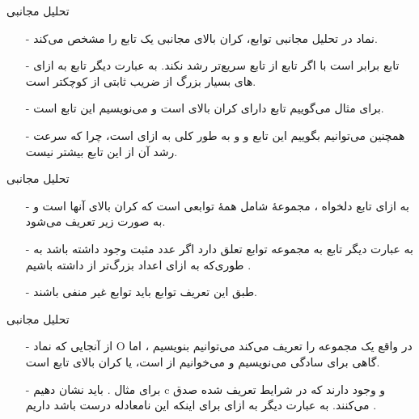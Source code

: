 \begin{frame}{‌تحلیل مجانبی}
\begin{itemize}\itemr
\item[-]
نماد
در تحلیل مجانبی توابع،
کران بالای مجانبی
 یک تابع را مشخص می‌کند.
\item[-]
 تابع
برابر است با 
اگر تابع
از تابع
 سریع‌تر رشد نکند.
 به عبارت دیگر تابع
  به ازای 
های بسیار بزرگ از ضریب ثابتی از 
کوچکتر است.
\item[-]
برای مثال می‌گوییم تابع
دارای کران بالای
است و می‌نویسیم این تابع
است.
\item[-]
همچنین می‌توانیم بگوییم این تابع
و
و به طور کلی
به ازای
است، چرا که سرعت رشد آن از این تابع بیشتر نیست.
\end{itemize}
\end{frame}


\begin{frame}{‌تحلیل مجانبی}
\begin{itemize}\itemr
\item[-]
به ازای تابع دلخواه
، مجموعهٔ
شامل همهٔ توابعی است که کران بالای آنها
است و به صورت زیر تعریف می‌شود.
\begin{flushleft}
\end{flushleft}
\item[-]
به عبارت دیگر تابع
به مجموعه توابع
تعلق دارد اگر عدد مثبت
وجود داشته باشد به طوری‌که به ازای اعداد
 بزرگ‌تر از 
 داشته باشیم
.
\item[-]
طبق این تعریف توابع
باید توابع غیر منفی باشند.
\end{itemize}
\end{frame}


\begin{frame}{‌تحلیل مجانبی}
\begin{itemize}\itemr
\item[-]
از آنجایی که نماد O در واقع یک مجموعه را تعریف می‌کند می‌توانیم بنویسیم
، اما گاهی برای سادگی می‌نویسیم
و می‌خوانیم
از
است، یا 
کران بالای تابع
است.
\item[-]
برای مثال
.
باید نشان دهیم c و
وجود دارند که در شرایط تعریف شده صدق می‌کنند. به عبارت دیگر
به ازای
برای اینکه این نامعادله درست باشد داریم
.
\end{itemize}
\end{frame}




